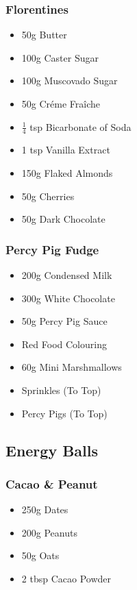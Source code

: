 \documentclass[11pt, english]{article}
\begin{document}
		\subsubsection*{Florentines}

	\begin{itemize}
        \setlength\itemsep{0cm}
                \item 50g Butter
		\item 100g Caster Sugar
		\item 100g Muscovado Sugar
		\item 50g Cr\'{e}me Fra\^{i}che
		\item $\frac{1}{4}$ tsp Bicarbonate of Soda
		\item 1 tsp Vanilla Extract
		\item 150g Flaked Almonds
		\item 50g Cherries
		\item 50g Dark Chocolate
        \end{itemize}

		\subsubsection*{Percy Pig Fudge}

	\begin{itemize}
        \setlength\itemsep{0cm}
                \item 200g Condensed Milk
		\item 300g White Chocolate
		\item 50g Percy Pig Sauce
		\item Red Food Colouring
		\item 60g Mini Marshmallows
		\item Sprinkles (To Top)
		\item Percy Pigs (To Top)
        \end{itemize}

\newpage

	\subsection{Energy Balls}

		\subsubsection*{Cacao \& Peanut}

	\begin{itemize}
        \setlength\itemsep{0cm}
                \item 250g Dates
		\item 200g Peanuts
		\item 50g Oats
		\item 2 tbsp Cacao Powder
        \end{itemize}
\end{document}
